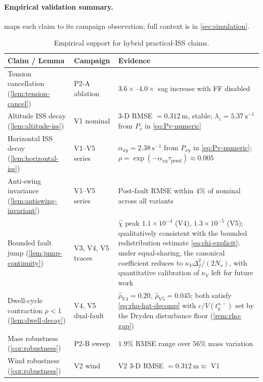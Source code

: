 \documentclass[lettersize,journal]{IEEEtran}
\begin{document}
\paragraph{Empirical validation summary.}
\label{sec:stability-empirical-validation}
 maps each claim to its campaign
observation; full context is in \cref{sec:simulation}.

\begin{table}[t]
  \centering
  \caption{Empirical support for hybrid practical-ISS claims.}
  \label{tab:stability-evidence}
  \small
  \renewcommand{\arraystretch}{1.05}
  \begin{tabular}{p{5.5cm}p{2.5cm}p{8cm}}
    \toprule
    Claim / Lemma & Campaign & Evidence \\
    \midrule
    Tension cancellation (\cref{lem:tension-cancel})
      & P2-A ablation
      & $3.6\times$--$4.0\times$ sag increase with FF
        disabled \\
    Altitude ISS decay (\cref{lem:altitude-iss})
      & V1 nominal
      & 3-D RMSE $= \SI{0.312}{\metre}$, stable;
        $\lambda_z = \SI{5.37}{\second^{-1}}$ from $P_v$
        in \eqref{eq:Pv-numeric} \\
    Horizontal ISS decay (\cref{lem:horizontal-iss})
      & V1--V5 series
      & $\alpha_{xy} = \SI{2.38}{\second^{-1}}$
        from $P_{xy}$ in \eqref{eq:Pv-numeric};
        $\rho = \exp(-\alpha_{xy}\tau_{\mathrm{pend}})
        \approx 0.005$ \\
    Anti-swing invariance (\cref{lem:antiswing-invariant})
      & V1--V5 series
      & Post-fault RMSE within $4\%$ of nominal
        across all variants \\
    Bounded fault jump (\cref{lem:jump-continuity})
      & V3, V4, V5 traces
      & $\hat\chi$ peak $1.1\!\times\!10^{-4}$ (V4),
        $1.3\!\times\!10^{-5}$ (V5); qualitatively consistent
        with the bounded redistribution estimate \eqref{eq:chi-explicit}; under equal-sharing, the canonical coefficient reduces to $\kappa_V\Delta_f^2/(2N_s)$, with quantitative calibration of $\kappa_V$ left for future work \\
    Dwell-cycle contraction $\rho < 1$
        (\cref{lem:dwell-decay})
      & V4, V5 dual-fault
      & $\hat\rho_{\mathrm{V4}} = 0.20$,
        $\hat\rho_{\mathrm{V5}} = 0.045$;
        both satisfy \eqref{eq:rho-hat-decomp}
        with $c/V(t_k^{\star,-})$ set by the Dryden
        disturbance floor (\cref{rem:rho-gap}) \\
    Mass robustness (\cref{cor:robustness})
      & P2-B sweep
      & $1.9\%$ RMSE range over $56\%$ mass variation \\
    Wind robustness (\cref{cor:robustness})
      & V2 wind
      & V2 3-D RMSE $= \SI{0.312}{\metre} \approx$ V1 \\
    \bottomrule
  \end{tabular}
\end{table}
\end{document}
